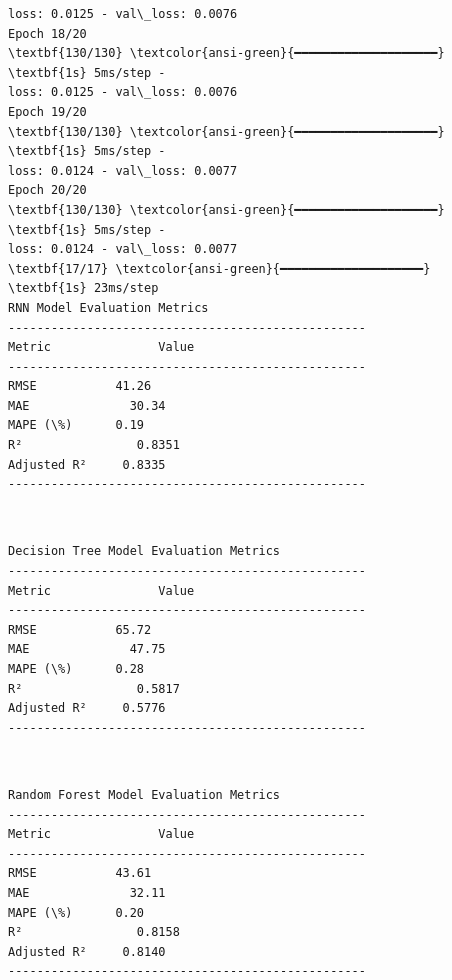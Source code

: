 \documentclass[11pt]{article}
\begin{document}
\begin{Verbatim}[commandchars=\\\{\}]
loss: 0.0125 - val\_loss: 0.0076
Epoch 18/20
\textbf{130/130} \textcolor{ansi-green}{━━━━━━━━━━━━━━━━━━━━} \textbf{1s} 5ms/step -
loss: 0.0125 - val\_loss: 0.0076
Epoch 19/20
\textbf{130/130} \textcolor{ansi-green}{━━━━━━━━━━━━━━━━━━━━} \textbf{1s} 5ms/step -
loss: 0.0124 - val\_loss: 0.0077
Epoch 20/20
\textbf{130/130} \textcolor{ansi-green}{━━━━━━━━━━━━━━━━━━━━} \textbf{1s} 5ms/step -
loss: 0.0124 - val\_loss: 0.0077
\textbf{17/17} \textcolor{ansi-green}{━━━━━━━━━━━━━━━━━━━━} \textbf{1s} 23ms/step
RNN Model Evaluation Metrics
--------------------------------------------------
Metric               Value
--------------------------------------------------
RMSE           41.26
MAE              30.34
MAPE (\%)      0.19
R²                0.8351
Adjusted R²     0.8335
--------------------------------------------------
    \end{Verbatim}

    \begin{center}
    \end{center}
    { \hspace*{\fill} \\}
    
    \begin{Verbatim}[commandchars=\\\{\}]
Decision Tree Model Evaluation Metrics
--------------------------------------------------
Metric               Value
--------------------------------------------------
RMSE           65.72
MAE              47.75
MAPE (\%)      0.28
R²                0.5817
Adjusted R²     0.5776
--------------------------------------------------
    \end{Verbatim}

    \begin{center}
    \end{center}
    { \hspace*{\fill} \\}
    
    \begin{Verbatim}[commandchars=\\\{\}]
Random Forest Model Evaluation Metrics
--------------------------------------------------
Metric               Value
--------------------------------------------------
RMSE           43.61
MAE              32.11
MAPE (\%)      0.20
R²                0.8158
Adjusted R²     0.8140
--------------------------------------------------
    \end{Verbatim}
\end{document}
